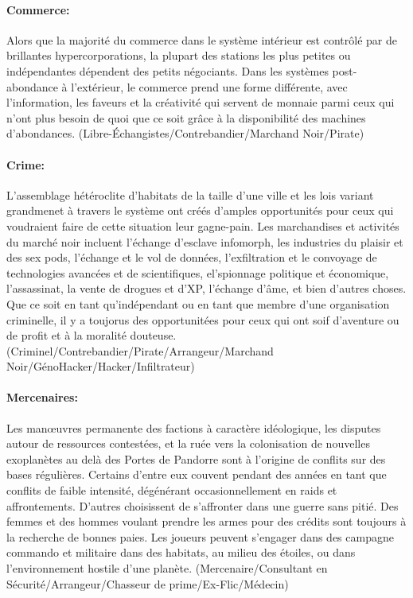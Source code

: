\paragraph{Commerce:} Alors que la majorité du commerce dans le système intérieur est contrôlé par de brillantes hypercorporations, la plupart des stations les plus petites ou indépendantes dépendent des petits négociants. Dans les systèmes post-abondance à l'extérieur, le commerce prend une forme différente, avec l'information, les faveurs et la créativité qui servent de monnaie parmi ceux qui n'ont plus besoin de quoi que ce soit grâce à la disponibilité des machines d'abondances. (Libre-Échangistes/Contrebandier/Marchand Noir/Pirate) 

\paragraph{Crime:} L'assemblage hétéroclite d'habitats de la taille d'une ville et les lois variant grandmenet à travers le système ont créés d'amples opportunités pour ceux qui voudraient faire de cette situation leur gagne-pain. Les marchandises et activités du marché noir incluent l'échange d'esclave infomorph, les industries du plaisir et des sex pods, l'échange et le vol de données, l'exfiltration et le convoyage de technologies avancées et de scientifiques, el'spionnage politique et économique, l'assassinat, la vente de drogues et d'XP, l'échange d'âme, et bien d'autres choses. Que ce soit en tant qu'indépendant ou en tant que membre d'une organisation criminelle, il y a toujorus des opportunitées pour ceux qui ont soif d'aventure ou de profit et à la moralité douteuse. (Criminel/Contrebandier/Pirate/Arrangeur/Marchand Noir/GénoHacker/Hacker/Infiltrateur) 

\paragraph{Mercenaires:} Les manœuvres permanente des factions à caractère idéologique, les disputes autour de ressources contestées, et la ruée vers la colonisation de nouvelles exoplanètes au delà des Portes de Pandorre sont à l'origine de conflits sur des bases régulières. Certains d'entre eux couvent pendant des années en tant que conflits de faible intensité, dégénérant occasionnellement en raids et affrontements. D'autres choisissent de s'affronter dans une guerre sans pitié. Des femmes et des hommes voulant prendre les armes pour des crédits sont toujours à la recherche de bonnes paies. Les joueurs peuvent s'engager dans des campagne commando et militaire dans des habitats, au milieu des étoiles, ou dans l'environnement hostile d'une planète. (Mercenaire/Consultant en Sécurité/Arrangeur/Chasseur de prime/Ex-Flic/Médecin) 


